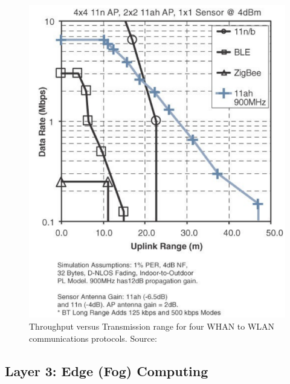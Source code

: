 \begin{figure}[H]
    \centering
    \includegraphics[width=0.55\linewidth]{images/communication-protocols-throughput.png}
    \caption{Throughput versus Transmission range for four WHAN to WLAN communications protocols. Source: \cite{10.5555/3161403}}
    \label{fig:communication-protocols-throughput}
\end{figure}




\subsection{Layer 3: Edge (Fog) Computing}
\label{sec:iot-model-layer3}

